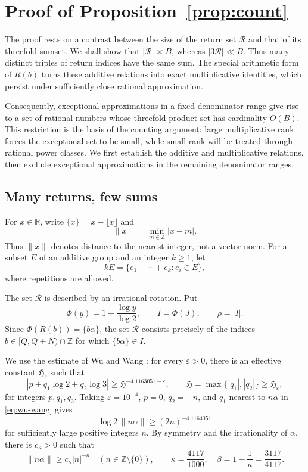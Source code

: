 \documentclass[11pt,reqno]{amsart}
\theoremstyle{definition}
\newcommand{\Z}{\mathbb Z}
\theoremstyle{plain}
\theoremstyle{definition}
\theoremstyle{remark}
\newcommand{\RR}{\mathcal R}
\newcommand{\norm}[1]{\lVert#1\rVert}
\begin{document}
\section{Proof of Proposition~\ref{prop:count}}
\label{sec:rotation}

The proof rests on a contrast between the size of the return
set $\RR$ and that of its threefold sumset. We shall show that
$|\RR|\asymp B$, whereas $|3\RR|\ll B$. Thus many distinct triples of return indices have
the same sum. The special
arithmetic form of $R(b)$ turns these additive relations into
exact multiplicative identities, which persist under sufficiently
close rational approximation.

Consequently, exceptional approximations in a fixed denominator
range give rise to a set of rational numbers whose threefold
product set has cardinality $O(B)$. This restriction is the
basis of the counting argument: large multiplicative rank
forces the exceptional set to be small, while small rank
will be treated through rational power classes. We first
establish the additive and multiplicative relations, then
exclude exceptional approximations in the remaining
denominator ranges.

\subsection{Many returns, few sums}

For $x\in\mathbb R$, write $\{x\}=x-\lfloor x\rfloor$ and
\[
 \norm{x}=\min_{m\in\Z}|x-m|.
\]
Thus $\norm{x}$ denotes distance to the nearest integer,
not a vector norm. For a subset $E$ of an additive group
and an integer $k\ge1$, let
\[
 kE=\{e_1+\cdots+e_k:e_i\in E\},
\]
where repetitions are allowed.

The set $\RR$ is described by an irrational rotation. Put
\[
 \Phi(y)=1-\frac{\log y}{\log2},\qquad
 I=\Phi(J),\qquad \rho=|I|.
\]
Since $\Phi(R(b))=\{b\alpha\}$, the set $\RR$ consists
precisely of the indices $b\in[Q,Q+N)\cap\Z$ for which
$\{b\alpha\}\in I$.

We use the estimate of Wu and Wang
\cite[Theorem~1]{WW}: for every $\varepsilon>0$, there
is an effective constant $\mathfrak H_\varepsilon$
such that
\begin{equation}\label{eq:wu-wang}
 |p+q_1\log2+q_2\log3|
 \ge\mathfrak H^{-4.1163051-\varepsilon},
 \qquad
 \mathfrak H=\max\{|q_1|,|q_2|\}
 \ge\mathfrak H_\varepsilon,
\end{equation}
for integers $p,q_1,q_2$.
Taking $\varepsilon=10^{-4}$, $p=0$, $q_2=-n$, and
$q_1$ nearest to $n\alpha$ in \eqref{eq:wu-wang}
gives
\[
 \log2\,\norm{n\alpha}\ge(2n)^{-4.1164051}
\]
for sufficiently large positive integers $n$.
By symmetry and the irrationality of $\alpha$,
there is $c_\kappa>0$ such that
\begin{equation}\label{eq:type}
 \norm{n\alpha}\ge c_\kappa|n|^{-\kappa}
 \quad(n\in\Z\setminus\{0\}),\qquad
 \kappa=\frac{4117}{1000},\quad
 \beta=1-\frac1\kappa=\frac{3117}{4117}.
\end{equation}
\end{document}
